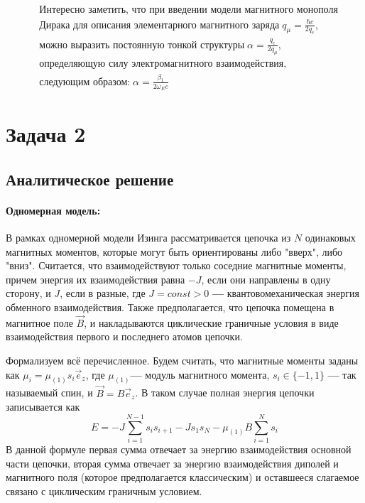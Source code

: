 \documentclass[oneside,final,14pt]{extarticle}
\begin{document}
	\vskip16pt
	\[
	\boxed{
		\begin{aligned}
			& \text{Интересно заметить, что при введении модели магнитного монополя} \\
			& \text{Дирака для описания элементарного магнитного заряда}\; q_{\mu} = \frac{\hbar c}{2q_{e}}, \\
			& \text{можно выразить постоянную тонкой структуры}\; \alpha = \frac{q_{e}}{2q_{\mu}}, \\
			& \text{определяющую силу электромагнитного взаимодействия,} \\
			& \text{следующим образом:}\; \alpha = \frac{\beta_{1}}{2 \omega_{E}c}
		\end{aligned}
	}
	\]
	
	\newpage
	\section{Задача 2}
	\subsection{Аналитическое решение}
	\paragraph{Одномерная модель:}
	В рамках одномерной модели Изинга рассматривается цепочка из $N$ одинаковых магнитных моментов, которые могут быть ориентированы либо "вверх", либо "вниз". Считается, что взаимодействуют только соседние магнитные моменты, причем энергия их взаимодействия равна $-J$, если они направлены в одну сторону, и $J$, если в разные, где $J=const>0$ \textbf{---} квантовомеханическая энергия обменного взаимодействия. Также предполагается, что цепочка помещена в магнитное поле $\vec B$, и накладываются циклические граничные условия в виде взаимодействия первого и последнего атомов цепочки. 
	
	Формализуем всё перечисленное. Будем считать, что магнитные моменты заданы как $\mu_{i}=\mu_{(1)}s_{i}\vec e_{z}$, где $\mu_{(1)}$\textbf{---} модуль магнитного момента, $s_{i} \in \{-1, 1\}$ \textbf{---} так называемый спин, и $\vec B=B\vec e_{z}$. В таком случае полная энергия цепочки записывается как 
	$$E=-J\sum_{i=1}^{N-1}s_{i}s_{i+1}-Js_{1}s_{N}-\mu_{(1)}B\sum_{i=1}^{N}s_{i}$$
	В данной формуле первая сумма отвечает за энергию взаимодействия основной части цепочки, вторая сумма отвечает за энергию взаимодействия диполей и магнитного поля (которое предполагается классическим) и оставшееся слагаемое связано с циклическим граничным условием. 
	
\end{document}
